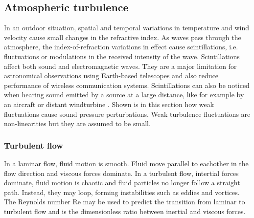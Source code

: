 



\subsection{Atmospheric turbulence}\label{theory:sound-propagation:atmospheric-turbulence}

In an outdoor situation, spatial and temporal variations in temperature and wind
velocity cause small changes in the refractive index. As waves pass through the
atmosphere, the index-of-refraction variations in effect cause scintillations,
i.e. fluctuations or modulations in the received intensity of the wave.
Scintillations affect both sound and electromagnetic waves. They are a major
limitation for astronomical observations using Earth-based telescopes and also
reduce performance of wireless communication systems. Scintillations can also be
noticed when hearing sound emitted by a source at a large distance, like for
example by an aircraft or distant windturbine \cite{Heutschi2014}.
Shown is in this section how weak fluctuations
cause sound pressure perturbations. Weak turbulence fluctuations are
non-linearities but they are assumed to be small.


\subsubsection*{Turbulent flow}
In a laminar flow, fluid motion is smooth. Fluid  move parallel
to eachother in the flow direction and viscous forces dominate. In a turbulent
flow, intertial forces dominate, fluid motion is chaotic and fluid particles no
longer follow a straight path. Instead, they may loop, forming instabilities
such as eddies and vortices. The Reynolds number $\mathrm{Re}$ may be used to
predict the transition from laminar to turbulent flow and is the dimensionless
ratio between inertial and viscous forces.

